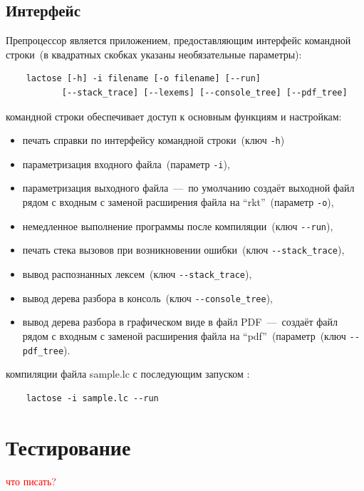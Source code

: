 \documentclass[12pt,a4paper,oneside]{extarticle}
\begin{document}
    \subsection{Интерфейс}
        Препроцессор является приложением, предоставляющим интерфейс командной строки~(в квадратных скобках указаны необязательные параметры):
        \begin{lstlisting}        
    lactose [-h] -i filename [-o filename] [--run]
           [--stack_trace] [--lexems] [--console_tree] [--pdf_tree]
        \end{lstlisting}

         командной строки обеспечивает доступ к основным функциям и настройкам:
        \begin{itemize}
                \item печать справки по интерфейсу командной строки~(ключ \lstinline$-h$)
                \item параметризация входного файла~(параметр \lstinline$-i$),
                \item параметризация выходного файла~---~по умолчанию создаёт выходной файл рядом с входным с заменой расширения файла на ``rkt''~(параметр \lstinline$-o$),
                \item немедленное выполнение программы после компиляции~(ключ \lstinline$--run$),
                \item печать стека вызовов при возникновении ошибки~(ключ \lstinline$--stack_trace$),
                \item вывод распознанных лексем~(ключ \lstinline$--stack_trace$),
                \item вывод дерева разбора в консоль~(ключ \lstinline$--console_tree$),
                \item вывод дерева разбора в графическом виде в файл PDF~---~создаёт файл рядом с входным с заменой расширения файла на ``pdf''~(параметр~(ключ \lstinline$--pdf_tree$).
        \end{itemize}

         компиляции файла sample.lc с последующим запуском :
        \begin{lstlisting}        
    lactose -i sample.lc --run
        \end{lstlisting}
\clearpage

\section{Тестирование}
    \textcolor{red}{что писать?}
\end{document}
